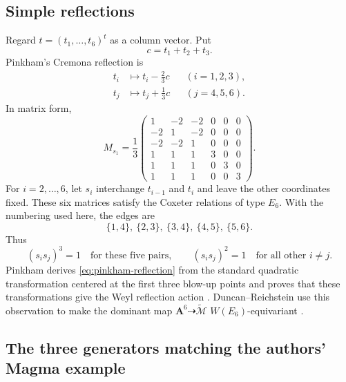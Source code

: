 \documentclass[11pt]{article}
\newcommand{\Aff}{\mathbf{A}}
\newcommand{\tcM}{\widetilde{\mathcal{M}}}
\begin{document}
\subsection{Simple reflections}

Regard $t=(t_1,\ldots,t_6)^t$ as a column vector.  Put
\[
  c=t_1+t_2+t_3.
\]
Pinkham's Cremona reflection is
\begin{equation}
\begin{aligned}
 t_i&\longmapsto t_i-\frac23c &&(i=1,2,3),\\
 t_j&\longmapsto t_j+\frac13c &&(j=4,5,6).
\end{aligned}
\label{eq:pinkham-reflection}
\end{equation}
In matrix form,
\begin{equation}
 M_{s_1}=\frac13
 \begin{pmatrix}
  1&-2&-2&0&0&0\\
 -2& 1&-2&0&0&0\\
 -2&-2& 1&0&0&0\\
  1& 1& 1&3&0&0\\
  1& 1& 1&0&3&0\\
  1& 1& 1&0&0&3
 \end{pmatrix}.
 \label{eq:pinkham-matrix}
\end{equation}
For $i=2,\ldots,6$, let $s_i$ interchange $t_{i-1}$ and $t_i$ and leave the
other coordinates fixed.  These six matrices satisfy the Coxeter relations of type
$E_6$.  With the numbering used here, the edges are
\[
  \{1,4\},\ \{2,3\},\ \{3,4\},\ \{4,5\},\ \{5,6\}.
\]
Thus
\[
 (s_is_j)^3=1
 \quad\text{for these five pairs},
 \qquad
 (s_is_j)^2=1
 \quad\text{for all other }i\neq j.
\]
Pinkham derives \eqref{eq:pinkham-reflection} from the standard quadratic
transformation centered at the first three blow-up points and proves that these
transformations give the Weyl reflection action \cite[pp.~196--198]{Pinkham}.
Duncan--Reichstein use this observation to make the dominant map
$\Aff^6\dashrightarrow\tcM$ $W(E_6)$-equivariant \cite[Lemma 6.1]{DR-PR}.

\subsection{The three generators matching the authors' Magma example}
\end{document}
